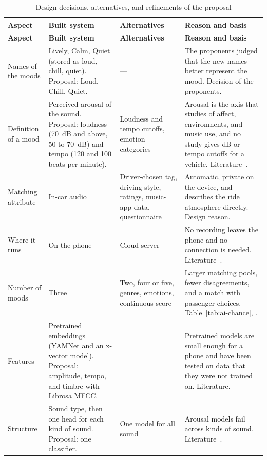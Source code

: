 {
\small
\setlength{\tabcolsep}{4pt}
\renewcommand{\arraystretch}{1.2}
\begin{longtable}{|>{\raggedright\arraybackslash}p{}|>{\raggedright\arraybackslash}p{}|>{\raggedright\arraybackslash}p{}|>{\raggedright\arraybackslash}p{}|}
\caption{Design decisions, alternatives, and refinements of the proposal}\label{tab:ai-choices}\\
\hline
\textbf{Aspect} & \textbf{Built system} & \textbf{Alternatives} & \textbf{Reason and basis} \\
\hline
\endfirsthead
\hline
\textbf{Aspect} & \textbf{Built system} & \textbf{Alternatives} & \textbf{Reason and basis} \\
\hline
\endhead
\endfoot
Names of the moods & Lively, Calm, Quiet (stored as loud, chill, quiet). Proposal: Loud, Chill, Quiet. & --- & The proponents judged that the new names better represent the mood. Decision of the proponents. \\
\hline
Definition of a mood & Perceived arousal of the sound. Proposal: loudness (70~dB and above, 50 to 70~dB) and tempo (120 and 100 beats per minute). & Loudness and tempo cutoffs, emotion categories & Arousal is the axis that studies of affect, environments, and music use, and no study gives dB or tempo cutoffs for a vehicle. Literature~\cite{russell1980circumplex,russell1980environments,panda2023audio}. \\
\hline
Matching attribute & In-car audio & Driver-chosen tag, driving style, ratings, music-app data, questionnaire & Automatic, private on the device, and describes the ride atmosphere directly. Design reason. \\
\hline
Where it runs & On the phone & Cloud server & No recording leaves the phone and no connection is needed. Literature~\cite{zhao2022survey}. \\
\hline
Number of moods & Three & Two, four or five, genres, emotions, continuous score & Larger matching pools, fewer disagreements, and a match with passenger choices. Table~\ref{tab:ai-chance}, \cite{hu2008mirex,hu2007simplified,gomez2019emotions,roth2008market}. \\
\hline
Features & Pretrained embeddings (YAMNet and an x-vector model). Proposal: amplitude, tempo, and timbre with Librosa MFCC. & --- & Pretrained models are small enough for a phone and have been tested on data that they were not trained on. Literature. \\
\hline
Structure & Sound type, then one head for each kind of sound. Proposal: one classifier. & One model for all sound & Arousal models fail across kinds of sound. Literature~\cite{zhang2026generalisation}. \\

\end{longtable}}
